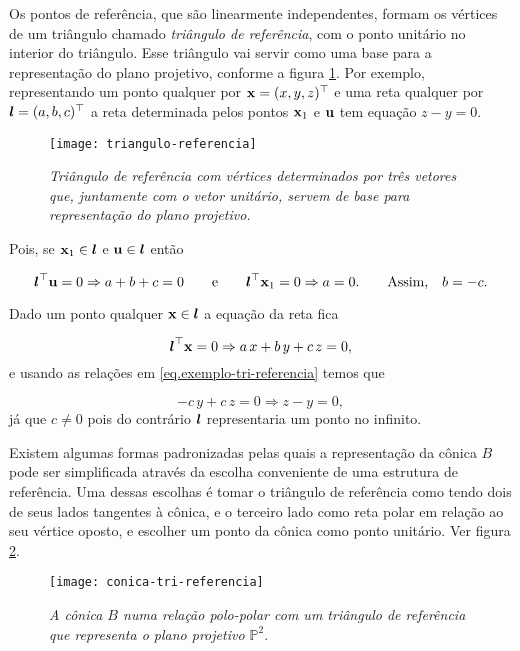 Os pontos de referência, que são linearmente independentes, formam os vértices de um triângulo chamado \textit{triângulo de referência}, com o ponto unitário no interior do triângulo. Esse triângulo vai servir como uma base para a representação do plano projetivo, conforme a figura \ref{fig.triangulo-referencia}. Por exemplo, representando um ponto qualquer por $\mathbf{x}=(x,y,z)^\top$ e uma reta qualquer por $\boldsymbol{l}=(a,b,c)^\top$ a reta determinada pelos pontos $\mathbf{x}_1$ e ${\bf u}$ tem equação $z-y=0$.

\begin{figure}[!htb]
\centering
\texttt{[image: triangulo-referencia]}
\caption{{\it Triângulo de referência com vértices determinados por três vetores que, juntamente com o vetor unitário, servem de base para representação do plano projetivo.}}
\label{fig.triangulo-referencia}
\end{figure}

Pois, se $\mathbf{x}_1\in\boldsymbol{l}$ e ${\bf u}\in\boldsymbol{l}$ então

\begin{equation}\label{eq.exemplo-tri-referencia}
\boldsymbol{l}^\top{\bf u}=0\Rightarrow a+b+c=0\qquad\text{e}\qquad\boldsymbol{l}^\top\mathbf{x}_1=0\Rightarrow a=0.\qquad\text{Assim,}\quad b=-c.
\end{equation}

Dado um ponto qualquer $\mathbf{x}\in\boldsymbol{l}$ a equação da reta fica

\begin{equation*}
\boldsymbol{l}^\top\mathbf{x}=0\Rightarrow a\,x+b\,y+c\,z=0,
\end{equation*}
e usando as relações em \ref{eq.exemplo-tri-referencia} temos que

\begin{equation*}
-c\,y+c\,z=0\Rightarrow z-y=0,
\end{equation*}
já que $c\neq 0$ pois do contrário $\boldsymbol{l}$ representaria um ponto no infinito.

Existem algumas formas padronizadas pelas quais a representação da cônica $B$ pode ser simplificada através da escolha conveniente de uma estrutura de referência. Uma dessas escolhas é tomar o triângulo de referência como tendo dois de seus lados tangentes à cônica, e o terceiro lado como reta polar em relação ao seu vértice oposto, e escolher um ponto  da cônica como ponto unitário. Ver figura \ref{fig.conica-tri-referencia}.

\begin{figure}[!htb]
\centering
\texttt{[image: conica-tri-referencia]}
\caption{{\it A cônica $B$ numa relação polo-polar com um triângulo de referência que representa o plano projetivo $\mathbb{P}^2$}.}
\label{fig.conica-tri-referencia}
\end{figure}

